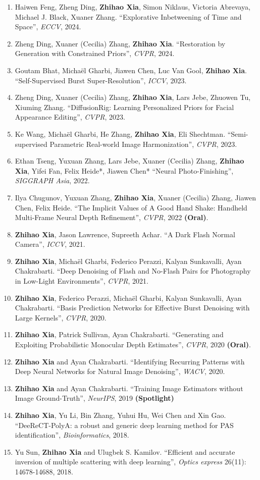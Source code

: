 \documentclass{resume} %
\newcommand{\B}[1]{\textbf{#1}}
\newcommand{\pub}[1]{\textrm{\textit{#1}}}
\begin{document}
\begin{enumerate}
  \item Haiwen Feng, Zheng Ding, \B{Zhihao Xia}, Simon Niklaus, Victoria Abrevaya, Michael J. Black, Xuaner Zhang. ``Explorative Inbetweening of Time and Space'', \pub{ECCV}, 2024.
  \item Zheng Ding, Xuaner (Cecilia) Zhang, \B{Zhihao Xia}. ``Restoration by Generation with Constrained Priors'', \pub{CVPR}, 2024.
  \item Goutam Bhat, Micha\"el Gharbi, Jiawen Chen, Luc Van Gool, \B{Zhihao Xia}. ``Self-Supervised Burst Super-Resolution'', \pub{ICCV}, 2023.
  \item Zheng Ding, Xuaner (Cecilia) Zhang, \B{Zhihao Xia}, Lars Jebe, Zhuowen Tu, Xiuming Zhang. ``DiffusionRig: Learning Personalized Priors for Facial Appearance Editing'', \pub{CVPR}, 2023.
  \item Ke Wang, Michaël Gharbi, He Zhang, \B{Zhihao Xia}, Eli Shechtman. ``Semi-supervised Parametric Real-world Image Harmonization'', \pub{CVPR}, 2023.
  \item Ethan Tseng, Yuxuan Zhang, Lars Jebe, Xuaner (Cecilia) Zhang, \B{Zhihao Xia}, Yifei Fan, Felix Heide*, Jiawen Chen* ``Neural Photo-Finishing'', \pub{SIGGRAPH Asia}, 2022.
  \item Ilya Chugunov, Yuxuan Zhang, \B{Zhihao Xia}, Xuaner (Cecilia) Zhang, Jiawen Chen, Felix Heide. ``The Implicit Values of A Good Hand Shake: Handheld Multi-Frame Neural Depth Refinement'', \pub{CVPR}, 2022 \B{(Oral)}.
  \item \B{Zhihao Xia}, Jason Lawrence, Supreeth Achar. ``A Dark Flash Normal Camera'', \pub{ICCV}, 2021.
  \item \B{Zhihao Xia}, Micha\"el Gharbi, Federico Perazzi, Kalyan Sunkavalli, Ayan Chakrabarti. ``Deep Denoising of Flash and No-Flash Pairs for Photography in Low-Light Environments'', \pub{CVPR}, 2021.
  \item \B{Zhihao Xia}, Federico Perazzi, Micha\"el Gharbi, Kalyan Sunkavalli, Ayan Chakrabarti. ``Basis Prediction Networks for Effective Burst Denoising with Large Kernels'', \pub{CVPR}, 2020.
  \item \B{Zhihao Xia}, Patrick Sullivan, Ayan Chakrabarti. ``Generating and Exploiting Probabilistic Monocular Depth Estimates'', \pub{CVPR}, 2020 \B{(Oral)}.
  \item \B{Zhihao Xia} and Ayan Chakrabarti. ``Identifying Recurring Patterns with Deep Neural Networks for Natural Image Denoising'', \pub{WACV}, 2020.
  \item \B{Zhihao Xia} and Ayan Chakrabarti. ``Training Image Estimators without Image Ground-Truth'', \pub{NeurIPS}, 2019 \B{(Spotlight)}
  \item \B{Zhihao Xia}, Yu Li, Bin Zhang, Yuhui Hu, Wei Chen and Xin Gao. ``DeeReCT-PolyA: a robust and generic deep learning method for PAS identification'', \pub{Bioinformatics}, 2018.
  \item Yu Sun, \B{Zhihao Xia} and Ulugbek S. Kamilov. ``Efficient and accurate inversion of multiple scattering with deep learning'', \pub{Optics express} 26(11): 14678-14688, 2018.
  \end{enumerate}
\end{document}

